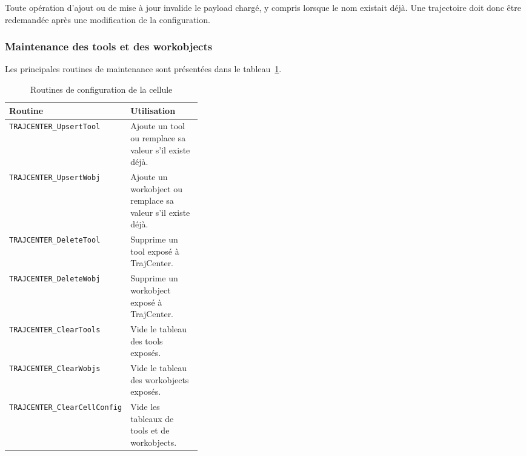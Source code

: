 \documentclass{rapportENSAM}
\begin{document}
Toute opération d'ajout ou de mise à jour invalide le payload chargé, y compris
lorsque le nom existait déjà. Une trajectoire doit donc être redemandée après
une modification de la configuration.


\subsubsection{Maintenance des tools et des workobjects}
\label{subsubsec:rapid-tools-wobjs-maintenance}

Les principales routines de maintenance sont présentées dans le
tableau~\ref{tab:rapid-cell-config-routines}.

\begin{table}[ht]
    \centering
    \begin{tabularx}{\linewidth}{
        |p{0.37\linewidth}
        |X|
    }
        \hline
        \textbf{Routine} &
        \textbf{Utilisation} \\
        \hline

        \texttt{TRAJCENTER\_UpsertTool} &
        Ajoute un tool ou remplace sa valeur s'il existe déjà. \\
        \hline

        \texttt{TRAJCENTER\_UpsertWobj} &
        Ajoute un workobject ou remplace sa valeur s'il existe déjà. \\
        \hline

        \texttt{TRAJCENTER\_DeleteTool} &
        Supprime un tool exposé à TrajCenter. \\
        \hline

        \texttt{TRAJCENTER\_DeleteWobj} &
        Supprime un workobject exposé à TrajCenter. \\
        \hline

        \texttt{TRAJCENTER\_ClearTools} &
        Vide le tableau des tools exposés. \\
        \hline

        \texttt{TRAJCENTER\_ClearWobjs} &
        Vide le tableau des workobjects exposés. \\
        \hline

        \texttt{TRAJCENTER\_ClearCellConfig} &
        Vide les tableaux de tools et de workobjects. \\
        \hline
    \end{tabularx}
    \caption{Routines de configuration de la cellule}
    \label{tab:rapid-cell-config-routines}
\end{table}
\end{document}

